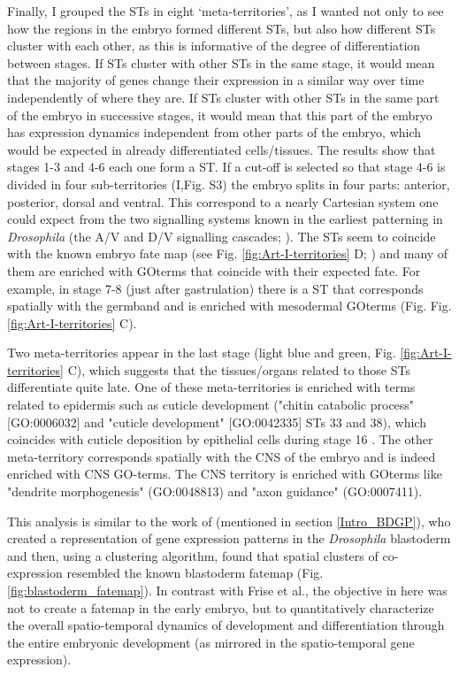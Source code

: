 Finally, I grouped the STs in eight `meta-territories', as I wanted not only to see how the regions in the embryo formed different STs, but also how different STs cluster with each other, as this is informative of the degree of differentiation between stages. If STs cluster with other STs in the same stage, it would mean that the majority of genes change their expression in a similar way over time independently of where they are.
If STs cluster with other STs in the same part of the embryo in successive stages, it would mean that this part of the embryo has expression dynamics independent from other parts of the embryo, which would be expected in already differentiated cells/tissues.
The results show that stages 1-3 and 4-6 each one form a ST. If a cut-off is selected so that stage 4-6 is divided in four sub-territories (I,Fig. S3) the embryo splits in four parts: anterior, posterior, dorsal and ventral.
This correspond to a nearly Cartesian system one could expect from the two signalling systems known in the earliest patterning in \textit{Drosophila} (the A/V and D/V signalling cascades; \citealp{Gilbert2014}).
%
The STs seem to coincide with the known embryo fate map (see Fig. \ref{fig:Art-I-territories} D; \citealp{Hartenstein1993}) and many of them are enriched with GOterms that coincide with their expected fate.
For example, in stage 7-8 (just after gastrulation) there is a ST that corresponds spatially with the germband and is enriched with mesodermal GOterms (Fig. Fig. \ref{fig:Art-I-territories} C).

Two meta-territories appear in the last stage (light blue and green, Fig. \ref{fig:Art-I-territories} C), which suggests that the tissues/organs related to those STs differentiate quite late.
One of these meta-territories is enriched with terms related to epidermis such as cuticle development ("chitin catabolic process" [GO:0006032] and "cuticle development" [GO:0042335] STs 33 and 38), which coincides with cuticle deposition by epithelial cells during stage 16 \citep{Ostrowski2002}.
%
The other meta-territory corresponds spatially with the CNS of the embryo and is indeed enriched with CNS GO-terms.
The CNS territory is enriched with GOterms like "dendrite morphogenesis" (GO:0048813) and "axon guidance" (GO:0007411). 
%

This analysis is similar to the work of \citet{Frise2010} (mentioned in section \ref{Intro_BDGP}), who created a representation of gene expression patterns in the \textit{Drosophila} blastoderm and then, using a clustering algorithm, found that spatial clusters of co-expression resembled the known blastoderm fatemap (Fig. \ref{fig:blastoderm_fatemap}).
In contrast with Frise et al., the objective in here was not to create a fatemap in the early embryo, but to quantitatively characterize the overall spatio-temporal dynamics of development and differentiation through the entire embryonic development (as mirrored in the spatio-temporal gene expression).

